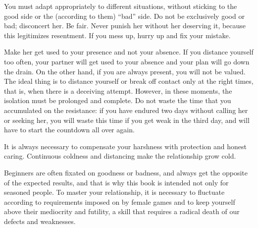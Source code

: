 

\par You must adapt appropriately to different situations, without sticking to the good side or the (according to them) \enquote{bad} side. Do not be exclusively good or bad; disconcert her. Be fair. Never punish her without her deserving it, because this legitimizes resentment. If you mess up, hurry up and fix your mistake.

\par Make her get used to your presence and not your absence. If you distance yourself too often, your partner will get used to your absence and your plan will go down the drain. On the other hand, if you are always present, you will not be valued. The ideal thing is to distance yourself or break off contact only at the right times, that is, when there is a deceiving attempt. However, in these moments, the isolation must be prolonged and complete. Do not waste the time that you accumulated on the resistance: if you have endured two days without calling her or seeking her, you will waste this time if you get weak in the third day, and will have to start the countdown all over again.

\par It is always necessary to compensate your harshness with protection and honest caring. Continuous coldness and distancing make the relationship grow cold.

\par Beginners are often fixated on goodness or badness, and always get the opposite of the expected results, and that is why this book is intended not only for seasoned people. To master your relationship, it is necessary to fluctuate according to requirements imposed on by female games and to keep yourself above their mediocrity and futility, a skill that requires a radical death of our defects and weaknesses.
